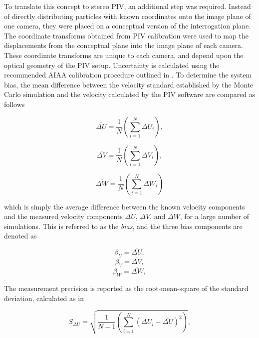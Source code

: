 To translate this concept to stereo PIV, an additional step was required. 
Instead of directly distributing particles with known coordinates onto the 
image 
plane of one camera, they were placed on a conceptual version of the 
interrogation plane. The coordinate transforms obtained from PIV calibration 
were used to map the displacements from the conceptual plane into the image 
plane of each camera. These coordinate transforms are unique to each camera, 
and depend upon the optical geometry of the PIV setup. Uncertainty is 
calculated using the recommended AIAA calibration procedure outlined in 
\cite{PIVuncertAIAA}. To determine the system bias, the mean difference between 
the velocity standard established by the Monte Carlo simulation and the 
velocity calculated by the PIV software are compared as follows

\begin{equation}
\overline{\Delta U} = \frac{1}{N} \left(\sum_{i=1}^N \Delta U_i \right),
\label{eq:Uerror}
\end{equation}

\begin{equation}
\overline{\Delta V} = \frac{1}{N} \left(\sum_{i=1}^N \Delta V_i \right),
\label{eq:Verror}
\end{equation}

\begin{equation}
\overline{\Delta W} = \frac{1}{N} \left(\sum_{i=1}^N \Delta W_i \right)
\label{eq:Werror}
\end{equation}

which is simply the average difference between the known velocity components 
and the measured velocity components $\Delta U$, $\Delta V$, and $\Delta W$, 
for a large number of simulations. This is referred to as the \textit{bias}, 
and the three bias components are denoted as

\begin{equation}
\beta_{U} = \overline{\Delta U},
\label{eq:Ubias}
\end{equation}
\begin{equation}
\beta_{V} = \overline{\Delta V},
\label{eq:Vbias}
\end{equation}
\begin{equation}
\beta_{W} = \overline{\Delta W},
\label{eq:Wbias}
\end{equation}

The measurement precision is reported as the root-mean-square of the  
standard deviation, calculated as in 
	
\begin{equation}
S_{\Delta U} = \sqrt{\frac{1}{N-1} \left(\sum_{i=1}^N (\Delta U_i - 
\overline{\Delta U})^2 \right)},
\label{eq:Usd}
\end{equation}

